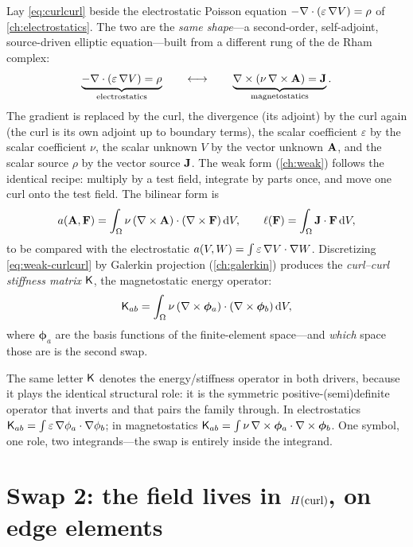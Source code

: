 Lay \cref{eq:curlcurl} beside the electrostatic Poisson equation
$-\nabla\cdot(\varepsilon\,\nabla V)=\rho$ of \cref{ch:electrostatics}. The two are the
\emph{same shape}---a second-order, self-adjoint, source-driven elliptic
equation---built from a different rung of the de Rham complex:
\[
  \underbrace{-\nabla\cdot(\varepsilon\,\nabla V)=\rho}_{\text{electrostatics}}
  \qquad\longleftrightarrow\qquad
  \underbrace{\nabla\times(\nu\,\nabla\times\mathbf{A})=\mathbf{J}}_{\text{magnetostatics}} .
\]
The gradient is replaced by the curl, the divergence (its adjoint) by the curl
again (the curl is its own adjoint up to boundary terms), the scalar coefficient
$\varepsilon$ by the scalar coefficient $\nu$, the scalar unknown $V$ by the vector
unknown $\mathbf{A}$, and the scalar source $\rho$ by the vector source $\mathbf{J}$. The weak
form (\cref{ch:weak}) follows the identical recipe: multiply by a test field,
integrate by parts once, and move one curl onto the test field. The bilinear form
is
\begin{equation}
  a(\mathbf{A},\mathbf{F}) = \int_\Omega \nu\,(\nabla\times\mathbf{A})\cdot(\nabla\times\mathbf{F})\,\mathrm{d}V,
  \qquad
  \ell(\mathbf{F}) = \int_\Omega \mathbf{J}\cdot\mathbf{F} \,\mathrm{d}V,
  \label{eq:weak-curlcurl}
\end{equation}
to be compared with the electrostatic
$a(V,W)=\int\varepsilon\,\nabla V\cdot\nabla W$. Discretizing
\cref{eq:weak-curlcurl} by Galerkin projection (\cref{ch:galerkin}) produces the
\emph{curl--curl stiffness matrix} $\mathsf{K}$, the magnetostatic energy operator:
\begin{equation}
  \mathsf{K}_{ab} = \int_\Omega \nu\,(\nabla\times\boldsymbol\phi_a)\cdot(\nabla\times\boldsymbol\phi_b)\,\mathrm{d}V,
  \label{eq:stiff-curlcurl}
\end{equation}
where $\boldsymbol\phi_a$ are the basis functions of the finite-element space---and
\emph{which} space those are is the second swap.

\begin{notationbox}
The same letter $\mathsf{K}$ denotes the energy/stiffness operator in both drivers,
because it plays the identical structural role: it is the symmetric
positive-(semi)definite operator that  inverts and that
 pairs the family through. In electrostatics
$\mathsf{K}_{ab}=\int\varepsilon\,\nabla\phi_a\cdot\nabla\phi_b$; in magnetostatics
$\mathsf{K}_{ab}=\int\nu\,\nabla\times\boldsymbol\phi_a\cdot\nabla\times\boldsymbol\phi_b$. One
symbol, one role, two integrands---the swap is entirely inside the integrand.
\end{notationbox}

\section{Swap 2: the field lives in \texorpdfstring{$H(\mathrm{curl})$}{H(curl)}, on edge elements}
\label{sec:swap2}

